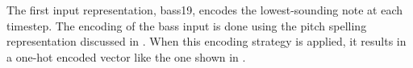 
The first input representation, \gls{bass19}, encodes the
lowest-sounding note at each timestep. The encoding of the
bass input is done using the pitch spelling representation
discussed in . When this
encoding strategy is applied, it results in a one-hot
encoded vector like the one shown in .

